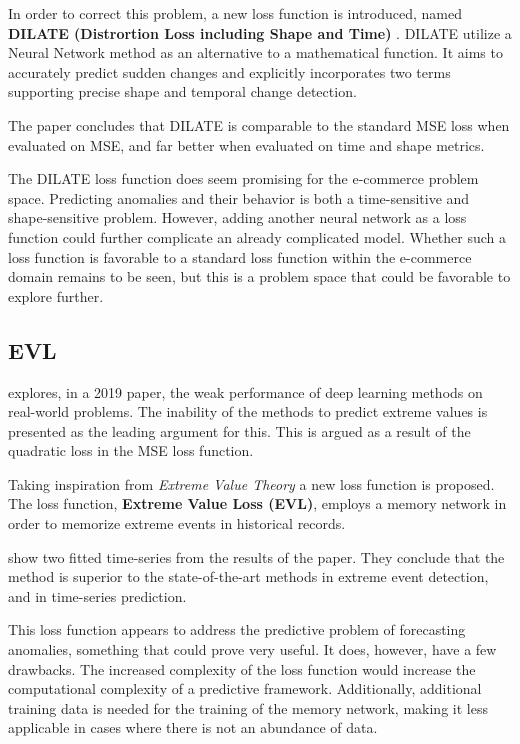 In order to correct this problem, a new loss function is introduced, named
\textbf{DILATE (Distrortion Loss including Shape and Time)} \cite{Guen2019}.
DILATE utilize a Neural Network method as an alternative to a mathematical function.
It aims to accurately predict sudden changes and explicitly incorporates two terms
supporting precise shape and temporal change detection.

The paper concludes that DILATE is comparable to the standard MSE loss when evaluated on MSE,
and far better when evaluated on time and shape metrics.

The DILATE loss function does seem promising for the e-commerce problem space.
Predicting anomalies and their behavior is both a time-sensitive and shape-sensitive problem.
However, adding another neural network as a loss function could further complicate an already complicated model.
Whether such a loss function is favorable to a standard loss function within the e-commerce domain remains to be seen,
but this is a problem space that could be favorable to explore further.

\subsection{EVL}
\citeauthor{Ding2019} explores, in a 2019 paper, the weak performance of deep learning methods on real-world problems.
The inability of the methods to predict extreme values is presented as the leading argument for this.
This is argued as a result of the quadratic loss in the MSE loss function.

Taking inspiration from \textit{Extreme Value Theory} a new loss function is proposed.
The loss function, \textbf{Extreme Value Loss (EVL)},
employs a memory network in order to memorize extreme events in historical records.

 show two fitted time-series from the results of the paper. They conclude
that the method is superior to the state-of-the-art methods in extreme event detection, and
in time-series prediction.

This loss function appears to address the predictive problem of forecasting anomalies,
something that could prove very useful.
It does, however, have a few drawbacks.
The increased complexity of the loss function would increase the computational complexity of a predictive framework.
Additionally, additional training data is needed for the training of the memory network,
making it less applicable in cases where there is not an abundance of data.

